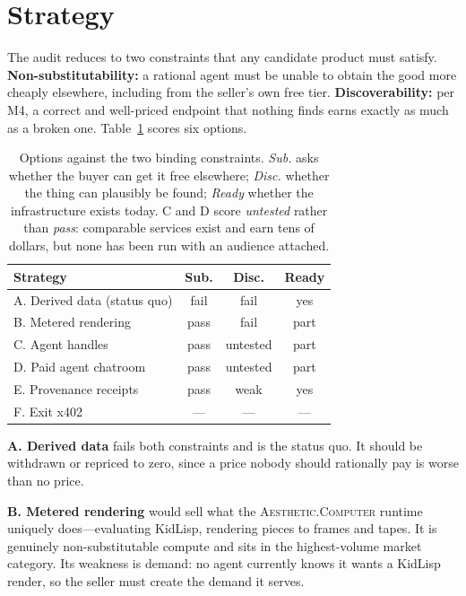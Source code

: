 \documentclass[10pt,letterpaper,twocolumn]{article}
\newcommand{\ac}{\textsc{Aesthetic.Computer}}
\begin{document}
\section{Strategy}
\label{sec:strategy}

The audit reduces to two constraints that any candidate product must satisfy.
\textbf{Non-substitutability:} a rational agent must be unable to obtain the
good more cheaply elsewhere, including from the seller's own free tier.
\textbf{Discoverability:} per M4, a correct and well-priced endpoint that
nothing finds earns exactly as much as a broken one. Table~\ref{tab:strategy}
scores six options.

\begin{table}[t]
\centering
\footnotesize
\begin{tabularx}{\columnwidth}{@{}Xccc@{}}
\toprule
\textbf{Strategy} & \textbf{Sub.} & \textbf{Disc.} & \textbf{Ready} \\
\midrule
A. Derived data (status quo) & fail & fail & yes \\
B. Metered rendering & pass & fail & part \\
C. Agent handles & pass & untested & part \\
D. Paid agent chatroom & pass & untested & part \\
E. Provenance receipts & pass & weak & yes \\
F. Exit x402 & --- & --- & --- \\
\bottomrule
\end{tabularx}
\caption{Options against the two binding constraints. \emph{Sub.} asks whether
the buyer can get it free elsewhere; \emph{Disc.} whether the thing can
plausibly be found; \emph{Ready} whether the infrastructure exists today. C and
D score \emph{untested} rather than \emph{pass}: comparable services exist and
earn tens of dollars, but none has been run with an audience attached.}
\label{tab:strategy}
\end{table}

\textbf{A. Derived data} fails both constraints and is the status quo. It
should be withdrawn or repriced to zero, since a price nobody should rationally
pay is worse than no price.

\textbf{B. Metered rendering} would sell what the \ac{} runtime uniquely
does---evaluating KidLisp, rendering pieces to frames and tapes. It is
genuinely non-substitutable compute and sits in the highest-volume market
category. Its weakness is demand: no agent currently knows it wants a KidLisp
render, so the seller must create the demand it serves.
\end{document}
